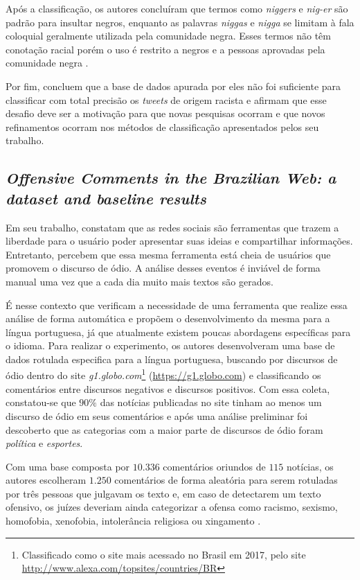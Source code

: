 Após a classificação, os autores concluíram que termos como \textit{niggers} e \textit{nig-er} são padrão para insultar negros, enquanto as palavras \textit{niggas} e \textit{nigga} se limitam à fala coloquial geralmente utilizada pela comunidade negra. Esses termos não têm conotação racial porém o uso é restrito a negros e a pessoas aprovadas pela comunidade negra \cite{kwok2013locate}.

Por fim,  concluem que a base de dados apurada por eles não foi suficiente para classificar com total precisão os \textit{tweets} de origem racista e afirmam que esse desafio deve ser a motivação para que novas pesquisas ocorram e que novos refinamentos ocorram nos métodos de classificação apresentados pelos seu trabalho.

\subsection{\textit{Offensive Comments in the Brazilian Web: a dataset and baseline results}}

Em seu trabalho,  constatam que as redes sociais são ferramentas que trazem a liberdade para o usuário poder apresentar suas ideias e compartilhar informações. Entretanto, percebem que essa mesma ferramenta está cheia de usuários que promovem o discurso de ódio. A análise desses eventos é inviável de forma manual uma vez que a cada dia muito mais textos são gerados.

É nesse contexto que  verificam a necessidade de uma ferramenta que realize essa análise de forma automática e propõem o desenvolvimento da mesma para a língua portuguesa, já que atualmente existem poucas abordagens específicas para o idioma. Para realizar o experimento, os autores desenvolveram uma base de dados rotulada especifica para a língua portuguesa, buscando por discursos de ódio dentro do site \textit{g1.globo.com}\footnote{ Classificado como o site mais acessado no Brasil em 2017, pelo site  \url{http://www.alexa.com/topsites/countries/BR}} (\url{https://g1.globo.com}) e classificando os comentários entre discursos negativos e discursos positivos. Com essa coleta, constatou-se que $90\%$ das notícias publicadas no site tinham ao menos um discurso de ódio em seus comentários e após uma análise preliminar foi descoberto que as categorias com a maior parte de discursos de ódio foram \textit{política} e \textit{esportes}.

Com uma base composta por $10.336$ comentários oriundos de $115$ notícias, os autores escolheram $1.250$ comentários de forma aleatória para serem rotuladas por três pessoas que julgavam os texto e, em caso de detectarem um texto ofensivo, os juízes deveriam ainda categorizar a ofensa como racismo, sexismo, homofobia, xenofobia, intolerância religiosa ou xingamento \cite{Pelle2017}. 

